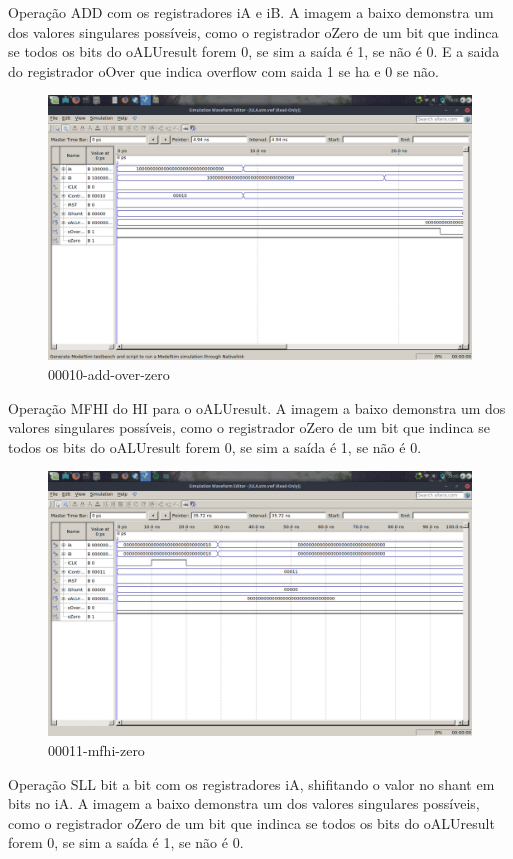 \documentclass[12pt]{article}
\begin{document}
Operação ADD com os registradores iA e iB.
A imagem a baixo demonstra um dos valores singulares possíveis, como o registrador oZero de um bit que indinca se todos os bits do oALUresult forem 0, se sim a saída é 1, se não é 0. E a saida do registrador oOver que indica overflow com saida 1 se ha e 0 se não. 
\begin{figure}[H]
	\centering
	\includegraphics[width=.8\textwidth]{00010-add-over-zero.png}
	\caption{00010-add-over-zero}
	\label{fig:00010-add-over-zero}
\end{figure}
Operação MFHI do HI para o oALUresult.
A imagem a baixo demonstra um dos valores singulares possíveis, como o registrador oZero de um bit que indinca se todos os bits do oALUresult forem 0, se sim a saída é 1, se não é 0.
\begin{figure}[H]
	\centering
	\includegraphics[width=.8\textwidth]{00011-mfhi-zero.png}
	\caption{00011-mfhi-zero}
	\label{fig:00011-mfhi-zero}
\end{figure}
Operação SLL bit a bit com os registradores iA, shifitando o valor no shant em bits no iA.
A imagem a baixo demonstra um dos valores singulares possíveis, como o registrador oZero de um bit que indinca se todos os bits do oALUresult forem 0, se sim a saída é 1, se não é 0.
\end{document}
